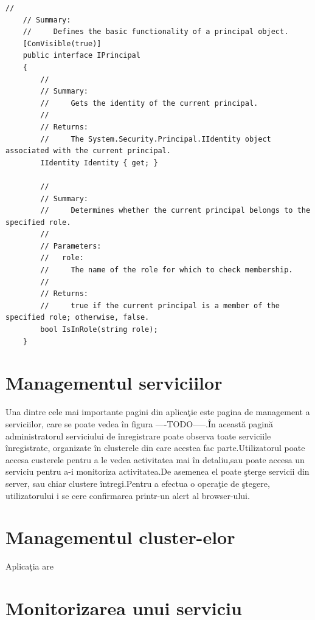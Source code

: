 \documentclass[a4paper,12pt]{report}
\begin{document}
\begin{lstlisting}[caption={Interfa\c ta IPrincipal},label={lst:IPrincipal},breaklines]
    //
    // Summary:
    //     Defines the basic functionality of a principal object.
    [ComVisible(true)]
    public interface IPrincipal
    {
        //
        // Summary:
        //     Gets the identity of the current principal.
        //
        // Returns:
        //     The System.Security.Principal.IIdentity object associated with the current principal.
        IIdentity Identity { get; }

        //
        // Summary:
        //     Determines whether the current principal belongs to the specified role.
        //
        // Parameters:
        //   role:
        //     The name of the role for which to check membership.
        //
        // Returns:
        //     true if the current principal is a member of the specified role; otherwise, false.
        bool IsInRole(string role);
    }
\end{lstlisting}

\section{Managementul serviciilor}

Una dintre cele mai importante pagini din aplica\c tie este pagina de management a
serviciilor, care se poate vedea \^in figura ----TODO-----.\^In aceast\u a pagin\u a
administratorul serviciului de \^inregistrare poate observa toate serviciile \^inregistrate,
organizate \^in clusterele din care acestea fac parte.Utilizatorul poate accesa custerele 
pentru a le vedea activitatea mai \^in detaliu,sau poate accesa un serviciu pentru 
a-i monitoriza activitatea.De asemenea el poate \c sterge servicii din server, sau chiar
clustere \^intregi.Pentru a efectua o opera\c tie de \c stegere, utilizatorului i se cere 
confirmarea printr-un alert al browser-ului.

\section{Managementul cluster-elor}

Aplica\c tia are 

\section{Monitorizarea unui serviciu}
\end{document}
